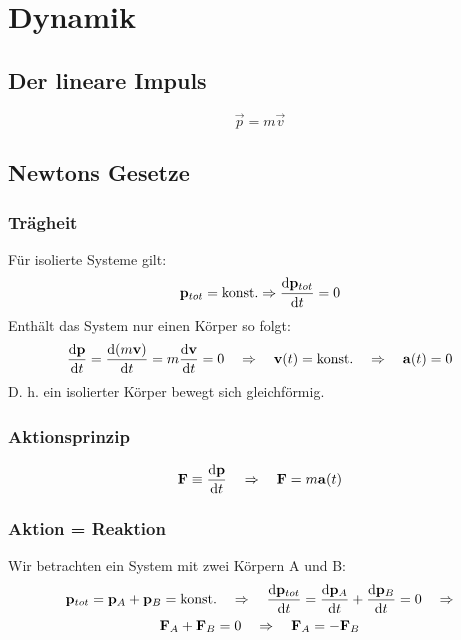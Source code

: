 \section{Dynamik}
\subsection{Der lineare Impuls}
\begin{equation}
\vec{p} = m \vec{v}
\end{equation}
\subsection{Newtons Gesetze}
\subsubsection{Trägheit}
Für isolierte Systeme gilt:
\begin{equation}
\mathbf{p}_{tot} = \text{konst.} \Rightarrow \frac{\mathrm d \mathbf{p}_{tot}}{\mathrm d t} = 0
\end{equation}
Enthält das System nur einen Körper so folgt:
\begin{equation}
\frac{\mathrm d \mathbf{p}}{\mathrm d t} = \frac{\mathrm d (m \mathbf{v})}{\mathrm d t} = m \frac{\mathrm d \mathbf{v}}{\mathrm d t} = 0 \quad\Rightarrow\quad \mathbf{v}(t) = \text{konst.} \quad\Rightarrow\quad \mathbf{a}(t) = 0
\end{equation}
D. h. ein isolierter Körper bewegt sich gleichförmig.
\subsubsection{Aktionsprinzip}
\begin{equation}
\mathbf{F} \equiv \frac{\mathrm d \mathbf{p}}{\mathrm d t} \quad\Rightarrow\quad \mathbf{F} = m \mathbf{a}(t)
\end{equation}
\subsubsection{Aktion = Reaktion}
Wir betrachten ein System mit zwei Körpern A und B:
\begin{gather}
\mathbf{p}_{tot} = \mathbf{p}_A + \mathbf{p}_B = \text{konst.} \quad\Rightarrow\quad
\frac{\mathrm d \mathbf{p}_{tot}}{\mathrm d t} = \frac{\mathrm d \mathbf{p}_A}{\mathrm d t} + \frac{\mathrm d \mathbf{p}_B}{\mathrm d t} = 0 \quad\Rightarrow \notag\\
\mathbf{F}_A + \mathbf{F}_B = 0 \quad\Rightarrow\quad
\mathbf{F}_A = - \mathbf{F}_B
\end{gather}

